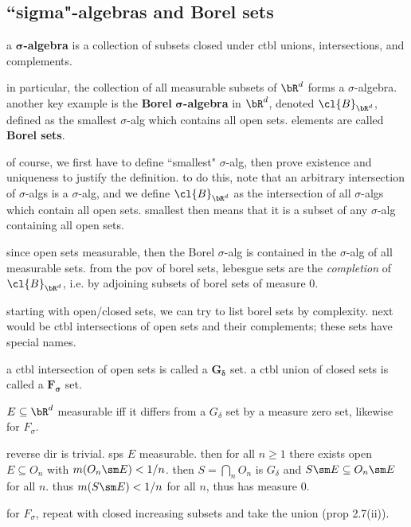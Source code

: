 \subsection{``sigma"-algebras and Borel sets}

\begin{defn}
    a $\bm{\sigma}$\textbf{-algebra} is a collection of subsets closed under
    ctbl unions, intersections, and complements.
\end{defn}

in particular, the collection of all measurable subsets of $\bR^{d}$ forms a
$\sigma$-algebra.
another key example is the \textbf{Borel} $\bm{\sigma}$\textbf{-algebra} in
$\bR^{d}$, denoted $\cl{B}_{\bR^{d}}$, defined as the smallest $\sigma$-alg which
contains all open sets.
elements are called \textbf{Borel sets}.

of course, we first have to define ``smallest" $\sigma$-alg,
then prove existence and uniqueness to justify the definition.
to do this, note that an arbitrary intersection of $\sigma$-algs is a
$\sigma$-alg, and we define $\cl{B}_{\bR^{d}}$ as the intersection of all
$\sigma$-algs which contain all open sets.
smallest then means that it is a subset of any $\sigma$-alg containing all open
sets.

since open sets measurable, then the Borel $\sigma$-alg is contained in the
$\sigma$-alg of all measurable sets.
from the pov of borel sets, lebesgue sets are the \textit{completion} of
$\cl{B}_{\bR^{d}}$, i.e. by adjoining subsets of borel sets of measure 0.

starting with open/closed sets, we can try to list borel sets by complexity.
next would be ctbl intersections of open sets and their complements;
these sets have special names.

\begin{defn}
    a ctbl intersection of open sets is called a $\bm{G_{\delta}}$ set.
    a ctbl union of closed sets is called a $\bm{F_{\sigma}}$ set.
\end{defn}

\begin{prop}
    $E\subseteq\bR^{d}$ measurable iff it differs from a $G_{\delta}$
    set by a measure zero set, likewise for $F_{\sigma}$.
\end{prop}

\begin{pf}[source=Primary Source Material]
    reverse dir is trivial.
    sps $E$ measurable. then for all $n\geq1$ there exists
    open $E\subseteq O_{n}$ with $m(O_{n}\sm E)<1/n$.
    then $S=\bigcap_{n}O_{n}$ is $G_{\delta}$ and $S\sm E \subseteq O_{n}\sm E$
    for all $n$.
    thus $m(S\sm E)<1/n$ for all $n$, thus has measure 0.

    for $F_{\sigma}$, repeat with closed increasing subsets and take the union
    (prop 2.7(ii)).
\end{pf}


